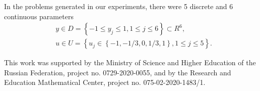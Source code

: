 \documentclass[
11pt,%
tightenlines,%
twoside,%
onecolumn,%
nofloats,%
nobibnotes,%
nofootinbib,%
superscriptaddress,%
noshowpacs,%
centertags]%
{revtex4}
\begin{document}
In the problems generated in our experiments, there were 5 discrete and 6 continuous parameters 
	\begin{eqnarray*}
	& y\in D = \left\{ -1 \leq y_j\leq 1, 1\leq j \leq 6 \right\} \subset R^6, \\
	& u\in U = \left\{ u_j \in  \left\{-1, -1/3, 0, 1/3, 1 \right\}, 1\leq j \leq 5 \right\}.
	\end{eqnarray*}




\begin{acknowledgments}
This work was supported by the Ministry of Science and Higher Education of the Russian Federation, project no. 0729-2020-0055, and by the Research and Education Mathematical Center, project no. 075-02-2020-1483/1.
\end{acknowledgments}


%
%
\end{document}
